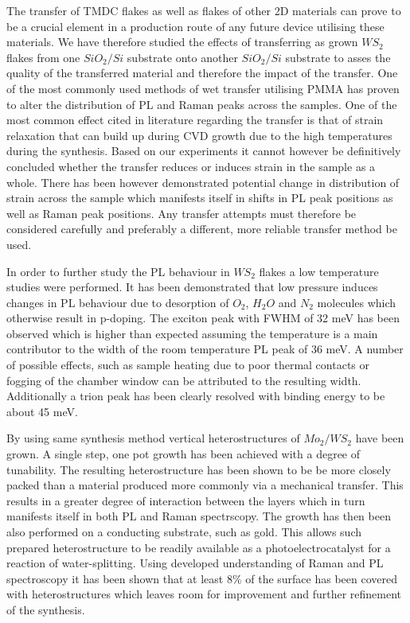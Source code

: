 The transfer of TMDC flakes as well as flakes of other 2D materials can prove to be a crucial element in a production route of any future device utilising these materials. We have therefore studied the effects of transferring as grown $WS_2$ flakes from one $SiO_2/Si$ substrate onto another $SiO_2/Si$ substrate to asses the quality of the transferred material and therefore the impact of the transfer. One of the most commonly used methods of wet transfer utilising PMMA has proven to alter the distribution of PL and Raman peaks across the samples. One of the most common effect cited in literature regarding the transfer is that of strain relaxation that can build up during CVD growth due to the high temperatures during the synthesis. Based on our experiments it cannot however be definitively concluded whether the transfer reduces or induces strain in the sample as a whole. There has been however demonstrated potential change in distribution of strain across the sample which manifests itself in shifts in PL peak positions as well as Raman peak positions. Any transfer attempts must therefore be considered carefully and preferably a different, more reliable transfer method be used.

In order to further study the PL behaviour in $WS_2$ flakes a low temperature studies were performed. It has been demonstrated that low pressure induces changes in PL behaviour due to desorption of $O_2$, $H_2O$ and $N_2$ molecules which otherwise result in p-doping. The exciton peak with FWHM of 32 meV has been observed which is higher than expected assuming the temperature is a main contributor to the width of the room temperature PL peak of 36 meV. A number of possible effects, such as sample heating due to poor thermal contacts or fogging of the chamber window can be attributed to the resulting width. Additionally a trion peak has been clearly resolved with binding energy to be about 45 meV.

By using same synthesis method vertical heterostructures of $Mo_2/WS_2$ have been grown. A single step, one pot growth has been achieved with a degree of tunability. The resulting heterostructure has been shown to be be more closely packed than a material produced more commonly via a mechanical transfer. This results in a greater degree of interaction between the layers which in turn manifests itself in both PL and Raman spectrscopy. The growth has then been also performed on a conducting substrate, such as gold. This allows such prepared heterostructure to be readily available as a photoelectrocatalyst for a reaction of water-splitting. Using developed understanding of Raman and PL spectroscopy it has been shown that at least 8$\%$ of the surface has been covered with heterostructures which leaves room for improvement and further refinement of the synthesis.


